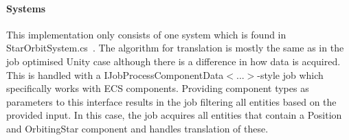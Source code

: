\paragraph{Systems}
This implementation only consists of one system which is found in StarOrbitSystem.cs~\cite{orbitSystem}. The algorithm for translation is mostly the same as in the job optimised Unity case although there is a difference in how data is acquired. This is handled with a IJobProcessComponentData$<$...$>$-style job which specifically works with ECS components. Providing component types as parameters to this interface results in the job filtering all entities based on the provided input. In this case, the job acquires all entities that contain a Position and OrbitingStar component and handles translation of these. 
